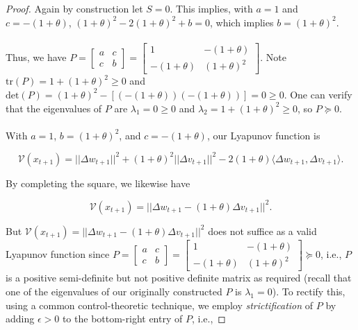 \documentclass[twoside,11pt]{article}
\begin{document}
\begin{proof}
\noindent
Again by construction let $S=0$. This implies, with $a=1$ and $c=-(1+\theta)$, $(1+\theta)^2 - 2(1+\theta)^2+b = 0$, which implies $b = (1+\theta)^2$. \\
\\
Thus, we have $P = \begin{bmatrix}
    a & c \\
    c & b
\end{bmatrix} = \begin{bmatrix}
    1 & -(1+\theta) \\
    -(1+\theta) & (1+\theta)^2
\end{bmatrix}$. Note $\text{tr}(P) = 1 + (1+\theta)^2 \geq 0$ and $\text{det}(P) = (1+\theta)^2 -[(-(1+\theta))(-(1+\theta))] = 0 \geq 0$. One can verify that the eigenvalues of $P$ are $\lambda_1 = 0 \geq 0$ and $\lambda_2 = 1 + (1+\theta)^2 \geq 0$, so $P \succeq 0$. \\
\\
With $a=1$, $b = (1+\theta)^2$, and $c = -(1+\theta)$, our Lyapunov function is 

\begin{equation}
\mathcal{V}(x_{t+1}) = ||\Delta w_{t+1}||^2 + (1+\theta)^2||\Delta v_{t+1}||^2 -2(1+\theta)\langle \Delta w_{t+1}, \Delta v_{t+1}\rangle.
\end{equation}

\noindent
By completing the square, we likewise have

\begin{equation}
\mathcal{V}(x_{t+1}) = ||\Delta w_{t+1} - (1+\theta)\Delta v_{t+1}||^2.
\end{equation}

\noindent
But $\mathcal{V}(x_{t+1}) = ||\Delta w_{t+1} - (1+\theta)\Delta v_{t+1}||^2$ does not suffice as a valid Lyapunov function since $P = \begin{bmatrix}
    a & c \\
    c & b
\end{bmatrix} = \begin{bmatrix}
    1 & -(1+\theta) \\
    -(1+\theta) & (1+\theta)^2
\end{bmatrix} \succeq 0$, i.e., $P$ is a positive semi-definite but not positive definite matrix as required (recall that one of the eigenvalues of our originally constructed $P$ is $\lambda_1 = 0$). To rectify this, using a common control-theoretic technique, we employ \textit{strictification} of $P$ by adding $\epsilon > 0$ to the bottom-right entry of $P$, i.e.,


\end{proof}
\end{document}
